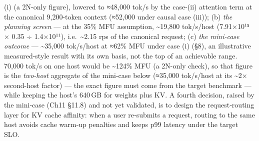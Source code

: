 (i) (a 2N-only figure), lowered to ≈48,000 tok/s by the case-(ii)
attention term at the canonical 9,200-token context (≈52,000 under
causal case (iii)); (b) \emph{the planning screen} --- at the 35\% MFU
assumption, \textasciitilde19,800 tok/s/host (7.91×10¹⁵ × 0.35 ÷
1.4×10¹¹), i.e.~\textasciitilde2.15 rps of the canonical request; (c)
\emph{the mini-case outcome} --- \textasciitilde35,000 tok/s/host at
≈62\% MFU under case (i) (§8), an illustrative measured-style result
with its own basis, not the top of an achievable range. 70,000 tok/s on
one host would be \textasciitilde124\% MFU (a 2N-only check), so that
figure is the \emph{two-host} aggregate of the mini-case below (≈35,000
tok/s/host at its \textasciitilde2× second-host factor) --- the exact
figure must come from the target benchmark --- while keeping the host's
640\,GB for weights plus KV. A fourth decision, raised by the mini‑case
(Ch11 §11.8) and not yet validated, is to design the request‑routing
layer for KV cache affinity: when a user re‑submits a request, routing
to the same host avoids cache warm‑up penalties and keeps p99 latency
under the target SLO.

\label{what-we-still-dont-know}


